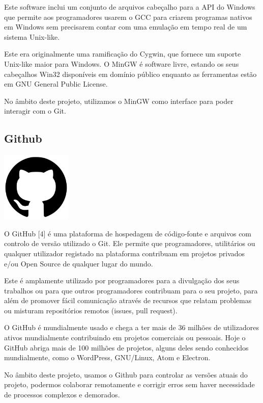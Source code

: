 \documentclass[a4paper,12pt]{article}
\begin{document}
Este software inclui um conjunto de arquivos cabeçalho para a API do Windows que permite aos programadores usarem o GCC para criarem programas nativos em Windows sem precisarem contar com uma emulação em tempo real de um sistema Unix-like.

Este era originalmente uma ramificação do Cygwin, que fornece um suporte Unix-like maior para Windows. O MinGW é software livre, estando os seus cabeçalhos Win32 disponíveis em domínio público enquanto as ferramentas estão em GNU General Public License.

No âmbito deste projeto, utilizamos o MinGW como interface para poder interagir com o Git.

\subsection{Github}
    \includegraphics[width=0.25\textwidth]{github.png} %
    \vspace{0.5cm}

O GitHub [4] é uma plataforma de hospedagem de código-fonte e arquivos com controlo de versão utilizado o Git. Ele permite que programadores, utilitários ou qualquer utilizador registado na plataforma contribuam em projetos privados e/ou Open Source de qualquer lugar do mundo. 

Este é amplamente utilizado por programadores para a divulgação dos seus trabalhos ou para que outros programadores contribuam para o seu projeto, para além de promover fácil comunicação através de recursos que relatam problemas ou misturam repositórios remotos (issues, pull request).

O GitHub é mundialmente usado e chega a ter mais de 36 milhões de utilizadores ativos mundialmente contribuindo em projetos comerciais ou pessoais. Hoje o GitHub abriga mais de 100 milhões de projetos, alguns deles sendo conhecidos mundialmente, como o WordPress, GNU/Linux, Atom e Electron.

No âmbito deste projeto, usamos o Github para controlar as versões atuais do projeto, podermos colaborar remotamente e corrigir erros sem haver necessidade de processos complexos e demorados.
\end{document}
